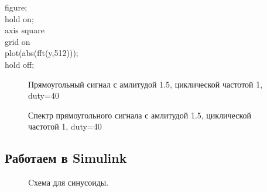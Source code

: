 \documentclass[12pt,a4paper]{scrartcl}
\begin{document}
figure;\\
hold on;\\
axis square\\
grid on\\
plot(abs(fft(y,512)));\\
hold off;\\

\begin{figure}[h!]
\caption{Прямоугольный сигнал с амлитудой 1.5, циклической частотой 1, duty=40}
\end{figure}

\begin{figure}[h!]
\caption{Спектр прямоугольного сигнала с амлитудой 1.5, циклической частотой 1, duty=40}
\end{figure}
\newpage

\subsection{Работаем в Simulink}
\label{sec:workSim}

\begin{figure}[h!]
\caption{Cхема для синусоиды.}
\end{figure}
\end{document}
